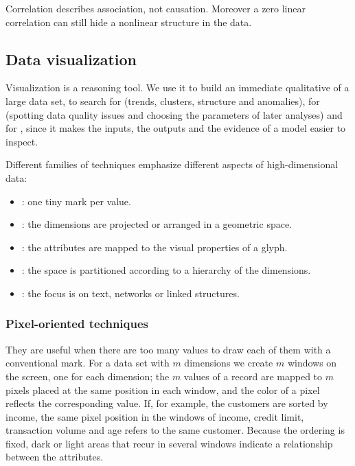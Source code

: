 \begin{remark}
Correlation describes association, not causation. Moreover a zero linear correlation can still hide a nonlinear structure in the data.
\end{remark}

\subsection{Data visualization}

Visualization is a reasoning tool. We use it to build an immediate qualitative  of a large data set, to search for  (trends, clusters, structure and anomalies), for  (spotting data quality issues and choosing the parameters of later analyses) and for , since it makes the inputs, the outputs and the evidence of a model easier to inspect.

Different families of techniques emphasize different aspects of high-dimensional data:
\begin{itemize}
    \item {}: one tiny mark per value.
    \item {}: the dimensions are projected or arranged in a geometric space.
    \item {}: the attributes are mapped to the visual properties of a glyph.
    \item {}: the space is partitioned according to a hierarchy of the dimensions.
    \item {}: the focus is on text, networks or linked structures.
\end{itemize}

\subsubsection{Pixel-oriented techniques}
They are useful when there are too many values to draw each of them with a conventional mark. For a data set with $m$ dimensions we create $m$ windows on the screen, one for each dimension; the $m$ values of a record are mapped to $m$ pixels placed at the same position in each window, and the color of a pixel reflects the corresponding value. If, for example, the customers are sorted by income, the same pixel position in the windows of income, credit limit, transaction volume and age refers to the same customer. Because the ordering is fixed, dark or light areas that recur in several windows indicate a relationship between the attributes.

